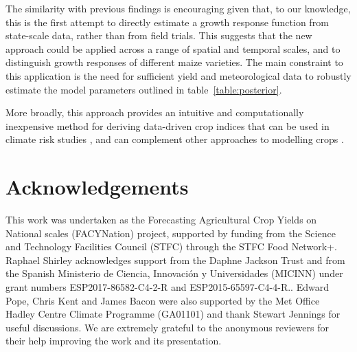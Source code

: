 \documentclass[12pt]{iopart}
\begin{document}
The similarity with previous findings is encouraging given that, to our knowledge, this is the first attempt to directly estimate a growth response function from state-scale data, rather than from field trials. This suggests that the new approach could be applied across a range of spatial and temporal scales, and to distinguish growth responses of different maize varieties. The main constraint to this application is the need for sufficient yield and meteorological data to robustly estimate the model parameters outlined in table~\ref{table:posterior}.  

More broadly, this approach provides an intuitive and computationally inexpensive method for deriving data-driven crop indices that can be used in climate risk studies \cite[e.g.][]{kent:2017}, and can complement other approaches to modelling crops \citep[e.g.][]{schlenker:2009, lobell:2010, carter:2016, zhou:2018}. 

\section*{Acknowledgements}

This work was undertaken as the Forecasting Agricultural Crop Yields on National scales (FACYNation) project, supported by funding from the Science and Technology Facilities Council (STFC) through the STFC Food Network+. Raphael Shirley acknowledges support from the Daphne Jackson Trust and from the Spanish Ministerio de Ciencia, Innovaci\'{o}n y Universidades (MICINN) under grant numbers ESP2017-86582-C4-2-R and ESP2015-65597-C4-4-R.. Edward Pope, Chris Kent and James Bacon were also supported by the Met Office Hadley Centre Climate Programme (GA01101) and thank Stewart Jennings for useful discussions. We are extremely grateful to the anonymous reviewers for their help improving the work and its presentation.




%
% 

% 


\end{document}
